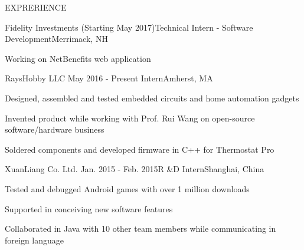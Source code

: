 \documentclass{resume} %
\begin{document}
	\begin{rSection}{EXPRERIENCE}
			
		\begin{rSubsection}{Fidelity Investments} {(Starting May 2017)}{Technical Intern - Software Development}{Merrimack, NH}
			\item Working on NetBenefits web application
		\end{rSubsection}
	
		\begin{rSubsection}{RaysHobby LLC} {May 2016 - Present}{ Intern}{Amherst, MA}
			\item Designed, assembled and tested embedded circuits and home automation gadgets
			\item Invented product while working with Prof. Rui Wang on open-source software/hardware business
			\item Soldered components and developed firmware in C++ for Thermostat Pro
		\end{rSubsection}
	
		\begin{rSubsection}{XuanLiang Co. Ltd.} {Jan. 2015 - Feb. 2015}{R \&D  Intern}{Shanghai, China}
			\item Tested and debugged Android games with over 1 million downloads
			\item Supported in conceiving new software features
			\item Collaborated in Java with 10 other team members while communicating in foreign language
		\end{rSubsection}
	
	\end{rSection}
	
	
\end{document}

